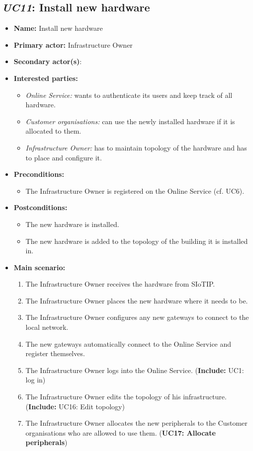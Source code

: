 \documentclass[english]{sareport}
\begin{document}
\subsection{\emph{UC11}: Install new hardware}
\begin{itemize}
    \item \textbf{Name:} Install new hardware
    \item \textbf{Primary actor:} Infrastructure Owner
    \item \textbf{Secondary actor(s)}: 
    \item \textbf{Interested parties:} 
        \begin{itemize}
            \item \textit{Online Service:}  wants to authenticate its users and keep track of all hardware.
            \item \textit{Customer organisations:} can use the newly installed hardware if it is allocated to them.
            \item \textit{Infrastructure Owner:} has to maintain topology of the hardware and has to place and configure it.
        \end{itemize}

    \item \textbf{Preconditions:}
        \begin{itemize}
            \item The Infrastructure Owner is registered on the Online Service (cf. UC6).
        \end{itemize}

    \item \textbf{Postconditions:}
        \begin{itemize}
            \item The new hardware is installed.
            \item The new hardware is added to the topology of the building it is installed in.
        \end{itemize}
        
    \item \textbf{Main scenario:} 
    \begin{enumerate}
       \item The Infrastructure Owner receives the hardware from SIoTIP.
       \item The Infrastructure Owner places the new hardware where it needs to be.
       \item The Infrastructure Owner configures any new gateways to connect to the local network.
       \item The new gateways automatically connect to the Online Service and register themselves.
       \item The Infrastructure Owner logs into the Online Service. (\textbf{Include:} UC1: log in)
       \item The Infrastructure Owner edits the topology of his infrastructure. (\textbf{Include:} UC16: Edit topology)
       \item The Infrastructure Owner allocates the new peripherals to the Customer organisations who are allowed to use them. (\textbf{UC17: Allocate peripherals})
    \end{enumerate}
\end{itemize}
\end{document}
